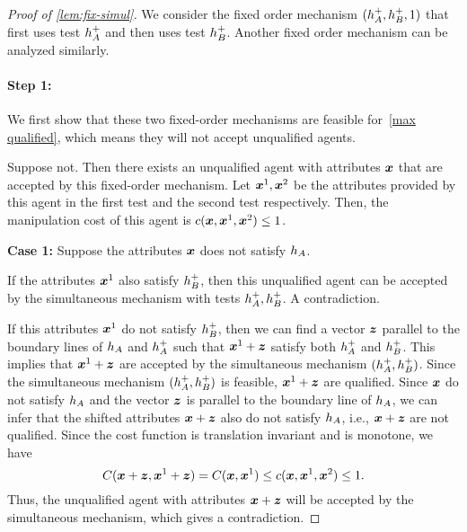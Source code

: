 \begin{proof}[Proof of \cref{lem:fix-simul}]
We consider the fixed order mechanism $(h_A^{+},h_B^{+},1)$ that first uses test $h_A^{+}$ and then uses test $h_B^{+}$. 
Another fixed order mechanism can be analyzed similarly.

\paragraph{Step 1:}
   We first show that these two fixed-order mechanisms are feasible for~\ref{max qualified}, which means they will not accept unqualified agents. 
    
    Suppose not. Then there exists an unqualified agent with attributes $\boldsymbol{x}$ that are accepted by this fixed-order mechanism. 
    Let $\boldsymbol{x}^1, \boldsymbol{x}^2$ be the attributes provided by this agent in the first test and the second test respectively.
    Then, the manipulation cost of this agent is $c(\boldsymbol{x}, \boldsymbol{x}^1, \boldsymbol{x}^2) \leq 1$.
    
    \textbf{Case 1:} Suppose the attributes $\boldsymbol{x}$ does not satisfy $h_A$.  
    
    If the attributes $\boldsymbol{x}^1$ also satisfy $ h_B^+$, then this unqualified agent can be accepted by the simultaneous mechanism with tests $h_A^{+},h_B^{+}$. 
    A contradiction.
    
    If this attributes $\boldsymbol{x}^1$ do not satisfy $h_B^+$, then we can find a vector $\boldsymbol{z}$ parallel to the boundary lines of $h_A$ and $h_A^+$ such that $\boldsymbol{x}^1 + \boldsymbol{z}$ satisfy both $ h_A^+$ and $h_B^+$. 
    This implies that $\boldsymbol{x}^1 + \boldsymbol{z}$ are accepted by the simultaneous mechanism $(h_A^{+},h_B^{+})$.
    Since the simultaneous mechanism $(h_A^{+},h_B^{+})$ is feasible, $\boldsymbol{x}^1 + \boldsymbol{z}$ are qualified.
    Since $\boldsymbol{x}$ do not satisfy $h_A$ and the vector $\boldsymbol{z}$ is parallel to the boundary line of $h_A$, we can infer that the shifted attributes $\boldsymbol{x} + \boldsymbol{z}$ also do not satisfy $h_A$, i.e.,  $\boldsymbol{x} + \boldsymbol{z}$ are not qualified. 
    Since the cost function is translation invariant and is monotone, we have 
    $$
    C(\boldsymbol{x}+\boldsymbol{z}, \boldsymbol{x}^1+\boldsymbol{z}) = C(\boldsymbol{x}, \boldsymbol{x}^1) \leq c(\boldsymbol{x}, \boldsymbol{x}^1, \boldsymbol{x}^2) \leq 1.
    $$
    Thus, the unqualified agent with attributes $\boldsymbol{x}+\boldsymbol{z}$ will be accepted by the simultaneous mechanism, which gives a contradiction. 


\end{proof}
